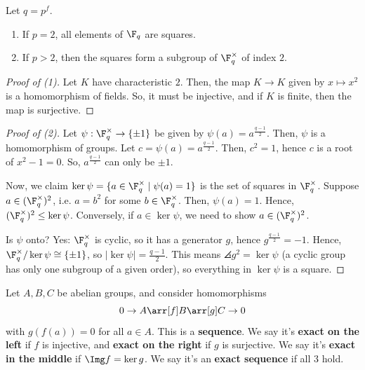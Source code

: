 \begin{thm}[][label=thm:squares-index-two]
    Let $q = p^f$.
    \begin{enumerate}[(1)]
        \item If $p = 2$, all elements of $\F_q$ are squares.
        \item If $p > 2$, then the squares form a subgroup of $\F_q^\times$ of index $2$.
    \end{enumerate}
\end{thm}

\begin{proof}[Proof of (1)]
    Let $K$ have characteristic $2$. Then, the map $K \to K$ given by $x \mapsto x^2$ is a homomorphism of fields. So, it must be injective, and if $K$ is finite, then the map is surjective.
\end{proof}

\begin{proof}[Proof of (2)]
    Let $\psi : \F_q^\times \to \{\pm 1\}$ be given by $\psi(a) = a^{\frac{q-1}{2}}$. Then, $\psi$ is a homomorphism of groups. Let $c = \psi(a) = a^{\frac{q-1}{2}}$. Then, $c^2 = 1$, hence $c$ is a root of $x^2 - 1 = 0$. So, $a^{\frac{q-1}{2}}$ can only be $\pm 1$.

    Now, we claim $\ker \psi = \{a \in \F_q^\times \mid \psi(a) = 1\}$ is the set of squares in $\F_q^\times$. Suppose $a \in (\F_q^\times)^2$, i.e. $a = b^2$ for some $b \in \F_q^\times$. Then, $\psi(a) = 1$. Hence, $(\F_q^\times)^2 \leq \ker \psi$. Conversely, if $a \in \ker \psi$, we need to show $a \in (\F_q^\times)^2$.

    Is $\psi$ onto? Yes: $\F_q^\times$ is cyclic, so it has a generator $g$, hence $g^{\frac{q-1}{2}} = -1$. Hence, $\F_q^\times / \ker \psi \cong \{\pm 1\}$, so $|\ker \psi| = \frac{q-1}{2}$. This means $\angles{g^2} = \ker \psi$ (a cyclic group has only one subgroup of a given order), so everything in $\ker \psi$ is a square.
\end{proof}

\begin{defn}
    Let $A, B, C$ be abelian groups, and consider homomorphisms
    $$0 \to A \arr[f] B \arr[g] C \to 0$$
    with $g(f(a)) = 0$ for all $a \in A$. This is a \textbf{sequence}. We say it's \textbf{exact on the left} if $f$ is injective, and \textbf{exact on the right} if $g$ is surjective. We say it's \textbf{exact in the middle} if $\Img f = \ker g$. We say it's an \textbf{exact sequence} if all $3$ hold.
\end{defn}

